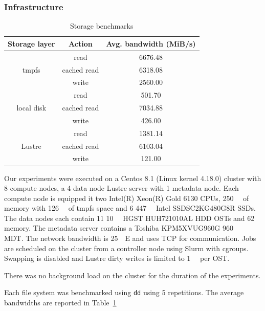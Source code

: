 \documentclass[10pt,journal,compsoc]{IEEEtran}
\begin{document}
\subsubsection{Infrastructure}
      \begin{table}
      \centering
      \begin{tabular}{ccc}
       \toprule
       Storage layer & Action & Avg. bandwidth (MiB/s) \\
       \midrule
      \multirow{3}{*}{tmpfs} & read & 6676.48 \\
      & cached read & 6318.08  \\
      & write & 2560.00 \\
      \midrule
       \multirow{3}{*}{local disk} & read & 501.70  \\
       & cached read & 7034.88 \\
       & write & 426.00 \\
       \midrule
       \multirow{3}{*}{Lustre} & read & 1381.14 \\
       & cached read & 6103.04  \\
       & write & 121.00  \\

       \bottomrule

      \end{tabular}
      \caption{Storage benchmarks}
      \label{table:sea-comp:fs}
      \end{table}
            Our experiments were executed on a Centos 8.1 (Linux kernel 4.18.0)
      cluster with 8 compute nodes, a 4 data node Lustre server with 1
      metadata node. Each compute node is equipped it two Intel(R) Xeon(R) Gold
      6130 CPUs, \SI{250}{\gibi\byte} of memory with \SI{126}{\gibi\byte} of
      tmpfs space and 6 \SI{447}{\gibi\byte} Intel SSDSC2KG480G8R SSDs. The data
      nodes each contain 11 \SI{10}{\tera\byte} HGST HUH721010AL HDD OSTs and
      \SI{62}{\gibi\byte} memory. The metadata server contains a Toshiba
      KPM5XVUG960G \SI{960}{\giga\byte} MDT. The network bandwidth is
      \SI{25}{\giga\bit}E and uses TCP for communication. Jobs are scheduled on
      the cluster from a controller node using Slurm with cgroups. Swapping is
      disabled and Lustre dirty writes is limited to \SI{1}{\giga\byte} per OST.


      There was no background load on the cluster for the duration of the experiments.


      Each file system was benchmarked using \texttt{dd} using 5 repetitions.
      The average bandwidths are reported in Table~\ref{table:sea-comp:fs}
\end{document}
